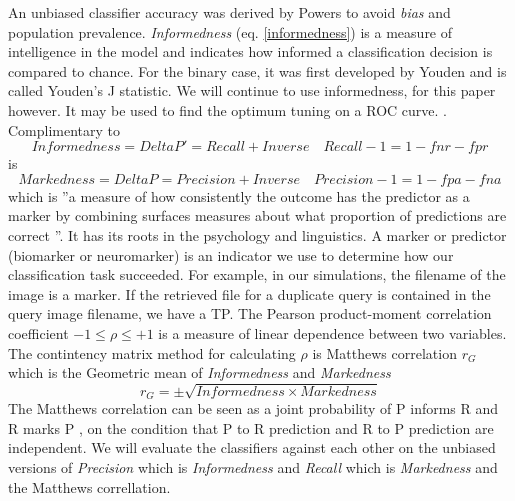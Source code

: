 \documentclass[english,12pt,a4paper,pdftex,elec,utf8, table]{aaltothesis}
\begin{document}
An unbiased classifier accuracy was derived by Powers \cite{Powers2003} to avoid \emph{bias} and population prevalence. \emph{Informedness} (eq. \ref{informedness}) is a measure of intelligence in the model and indicates how informed a classification decision is compared to chance. For the binary case, it was first developed by Youden and is called Youden's J statistic. We will continue to use informedness, for this paper however. It may be used to find the optimum tuning on a ROC curve. \cite{POWERS2011}. Complimentary to
\begin{equation}\label{informedness}
Informedness = DeltaP' = Recall + Inverse\quad Recall - 1 = 1 - fnr - fpr
\end{equation}
is
\begin{equation}\label{markedness}
Markedness = DeltaP = Precision + Inverse\quad Precision - 1 = 1 - fpa - fna
\end{equation}
which is ''a measure of how consistently the outcome has the predictor as a marker by combining surfaces measures about what proportion of predictions are correct \cite{POWERS2011}''.
It has its roots in the psychology and linguistics. A marker or predictor (biomarker or neuromarker) is an indicator we use to determine how our classification task succeeded. For example, in our simulations, the filename of the image is a marker. If the retrieved file for a duplicate query is contained in the query image filename, we have a TP. The Pearson product-moment correlation coefficient $-1 \leq \rho \leq +1$ is a measure of linear dependence between two variables. The contintency matrix method for calculating $\rho$ is Matthews correlation $r_G$ which is the Geometric mean of \emph{Informedness} and \emph{Markedness}
\begin{equation}\label{matthewscorrelation}
r_G = \pm \sqrt{Informedness \times Markedness}
\end{equation}
The Matthews correlation can be seen as a joint probability of P informs R and R marks P \cite{POWERS2011}, on the condition that P to R prediction and R to P prediction are independent.
We will evaluate the classifiers against each other on the unbiased versions of \emph{Precision} which is \emph{Informedness} and \emph{Recall} which is \emph{Markedness} and the Matthews correllation.
\end{document}
